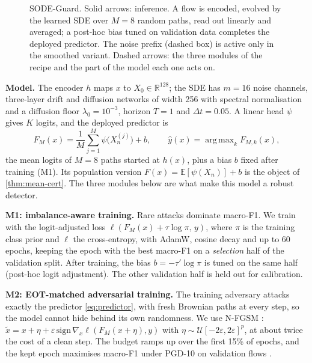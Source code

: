 \documentclass{article}
\theoremstyle{definition}
\newcommand{\Real}{\mathbb{R}}
\newcommand{\Exp}{\mathbb{E}}
\DeclareMathOperator*{\argmax}{arg\,max}
\begin{document}
\begin{figure}[t]
\caption{SODE-Guard. Solid arrows: inference. A flow is encoded, evolved by the
learned SDE over $M=8$ random paths, read out linearly and averaged; a post-hoc
bias tuned on validation data completes the deployed predictor. The noise
prefix (dashed box) is active only in the smoothed variant. Dashed arrows: the
three modules of the recipe and the part of the model each one acts on.}
\label{fig:arch}
\end{figure}

\textbf{Model.} The encoder $h$ maps $x$ to $X_0\in\Real^{128}$; the SDE has
$m=16$ noise channels, three-layer drift and diffusion networks of width 256
with spectral normalisation and a diffusion floor $\lambda_0=10^{-3}$, horizon
$T=1$ and $\Delta t=0.05$. A linear head $\psi$ gives $K$ logits, and the
deployed predictor is
\begin{equation}\label{eq:predictor}
  F_M(x)=\frac1M\sum_{j=1}^{M}\psi\bigl(X_n^{(j)}\bigr)+b,\qquad
  \hat y(x)=\argmax_k F_{M,k}(x),
\end{equation}
the mean logits of $M=8$ paths started at $h(x)$, plus a bias $b$ fixed after
training (M1). Its population version $F(x)=\Exp[\psi(X_n)]+b$ is the object of
\cref{thm:mean-cert}. The three modules below are what make this model a
robust detector.

\textbf{M1: imbalance-aware training.} Rare attacks dominate macro-F1. We train
with the logit-adjusted loss \citep{menon2021logit}
$\ell(F_M(x)+\tau\log\pi,\,y)$, where $\pi$ is the training class prior and
$\ell$ the cross-entropy, with AdamW, cosine decay and up to 60 epochs, keeping
the epoch with the best macro-F1 on a \emph{selection} half of the validation
split. After training, the bias $b=-\tau'\log\pi$ is tuned on the same half
(post-hoc logit adjustment). The other validation half is held out for
calibration.

\textbf{M2: EOT-matched adversarial training.} The training adversary attacks
exactly the predictor \eqref{eq:predictor}, with fresh Brownian paths at every
step, so the model cannot hide behind its own randomness. We use N-FGSM
\citep{dejorge2022nfgsm}: $\tilde x=x+\eta+\varepsilon\,\mathrm{sign}\,\nabla_x
\ell(F_M(x+\eta),y)$ with $\eta\sim\mathcal U[-2\varepsilon,2\varepsilon]^p$, at
about twice the cost of a clean step. The budget ramps up over the first 15\%
of epochs, and the kept epoch maximises macro-F1 under PGD-10 on validation
flows \citep{rice2020overfitting}.
\end{document}

